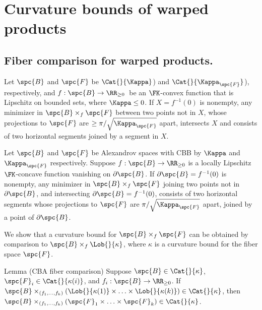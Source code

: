 
\chapter{Curvature bounds of warped products}



\section{Fiber comparison for warped products.}\label{sec:fiber-comparison}


Let $\spc{B}$ and $\spc{F}$ be  $\Cat{}{\Kappa}$) and  $\Cat{}{\Kappa_\spc{F}}$),
respectively, and
$f:\spc{B} \to \RR_{\ge 0}$\, be
an $\FK$-convex function that is Lipschitz on bounded sets, where
$\Kappa\le 0$. 
If $X=f^{-1}(0)$ is nonempty, any minimizer
in $\spc{B}\times_f\spc{F}$ between two points not in $X$, whose projections to
$\spc{F}$ are $\ge \pi/\sqrt{\Kappa_\spc{F}}$ apart,  intersects $X$ and consists of
two horizontal segments
joined by a segment in $X$.


Let $\spc{B}$ and $\spc{F}$ be Alexandrov spaces with
CBB by $\Kappa$ and $\Kappa_\spc{F} $ respectively. Suppose $f:\spc{B}\to \RR_{\ge 0}$
is a locally Lipschitz $\FK$-concave function vanishing on
$\partial \spc{B}$.  
If $\partial \spc{B}=f^{-1}(0)$ is nonempty, any minimizer in
$\spc{B}\times_f\spc{F}$ joining two points not in $\partial \spc{B}$,
and intersecting $\partial \spc{B}=f^{-1}(0)$, consists of two horizontal
segments whose
projections to $\spc{F}$ are $\pi/\sqrt{\Kappa_\spc{F}}$ apart, joined by a
point of $\partial \spc{B}$.




We show that a curvature bound for
$\spc{B}\times_f\spc{F}$ can be obtained by comparison to $\spc{B}\times_f\Lob{}{\kappa}$, where $\kappa$ is a curvature bound for the fiber space $\spc{F}$. %

\begin{thm}{Lemma (CBA fiber comparison)}
\label{thm:cba-fiber-comparison}
Suppose $\spc{B}\in \Cat{}{\kappa}$, 
$\spc{F}_i\in \Cat{}{\kappa(i)}$, and  $f_i:\spc{B}\to\RR_{\ge 0}$.  If  $\spc{B}\times_{(f_1,\ldots,f_k)}(\Lob{}{\kappa(1)}\times\ldots\times \Lob{}{\kappa(k)})\in \Cat{}{\kappa}$, then
$\spc{B}\times_{(f_1,\ldots,f_k)}(\spc{F}_1\times\ldots\times \spc{F}_k)\in \Cat{}{\kappa}$.
 \end{thm} 

